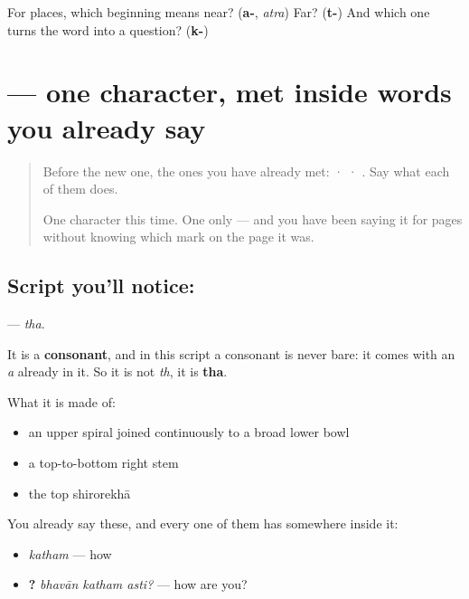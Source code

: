 \begin{tcolorbox}[breakable,colback=teal!4,colframe=teal!35!black,title={Before you move on}]
For places, which beginning means near? (\textbf{a-}, \emph{atra}) Far? (\textbf{t-}) And which one turns the word into a question? (\textbf{k-})
\end{tcolorbox}
\section[\texorpdfstring{\sk{थ} (tha)}{थ (tha)}]{ — one character, met inside words you already say}

\label{lesson:SA-S215-letter-tha}



\begin{quote}
Before the new one, the ones you have already met:  ·  · . Say what each of them does.

One character this time. One only — and you have been saying it for pages without knowing which mark on the page it was.
\end{quote}

\subsection*{Script you'll notice: }
\textbf{} — \emph{tha}.

It is a \textbf{consonant}, and in this script a consonant is never bare: it comes with an \emph{a} already in it. So it is not \emph{th}, it is \textbf{tha}.

What it is made of:

\begin{itemize}
\raggedright
  \item an upper spiral joined continuously to a broad lower bowl
  \item a top-to-bottom right stem
  \item the top shirorekhā
\end{itemize}

You already say these, and every one of them has  somewhere inside it:

\begin{itemize}
\raggedright
  \item \textbf{} \emph{katham} — how
  \item \textbf{  ?} \emph{bhavān katham asti?} — how are you?
\end{itemize}

